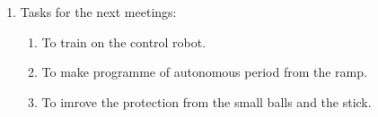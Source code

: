 \begin{enumerate}
	\item Tasks for the next meetings:
	\begin{enumerate}
		
		\item To train on the control robot.
		
		\item To make programme of autonomous period from the ramp.
		
		\item To imrove the protection from the small balls and the stick.
			
	\end{enumerate}
\end{enumerate}
\fillpage
